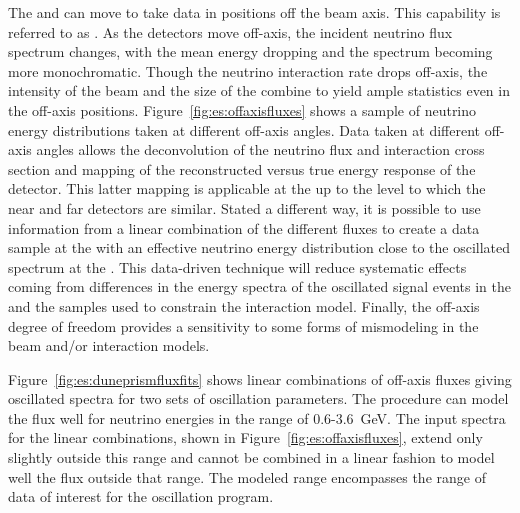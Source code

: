 The  and  can move to take data in positions off the beam axis.  This capability is referred to as . As the detectors move off-axis, the incident neutrino flux spectrum changes, with the mean energy dropping and the spectrum becoming more monochromatic.  Though the neutrino interaction rate drops off-axis, the intensity of the beam and the size of the   combine to yield ample statistics even in the off-axis positions. 
Figure~\ref{fig:es:offaxisfluxes} shows a sample of neutrino energy distributions taken at different off-axis angles.
%
Data taken at different off-axis angles allows the deconvolution of the neutrino flux and interaction cross section and mapping of the reconstructed versus true energy response of the detector.  This latter mapping is applicable at the  up to the level to which the near and far  detectors are similar.  Stated a different way, it is possible to use information from a linear combination of the different fluxes to create a data sample at the  with an effective neutrino energy distribution close to the oscillated spectrum at the .  This data-driven technique will reduce systematic effects coming from differences in the energy spectra of the oscillated signal events in the  and the  samples used to constrain the interaction model. Finally, the off-axis degree of freedom provides a sensitivity to some forms of mismodeling in the beam and/or interaction models. %

Figure~\ref{fig:es:duneprismfluxfits} shows linear combinations of off-axis fluxes giving  oscillated spectra for two sets of oscillation parameters. The procedure can model the  flux well for neutrino energies in the range of 0.6-3.6~GeV. The input spectra for the linear combinations, shown in Figure~\ref{fig:es:offaxisfluxes}, extend only slightly outside this range and cannot be combined in a linear fashion to model well the flux outside that range. The modeled range encompasses the range of data of interest for the oscillation program.   



